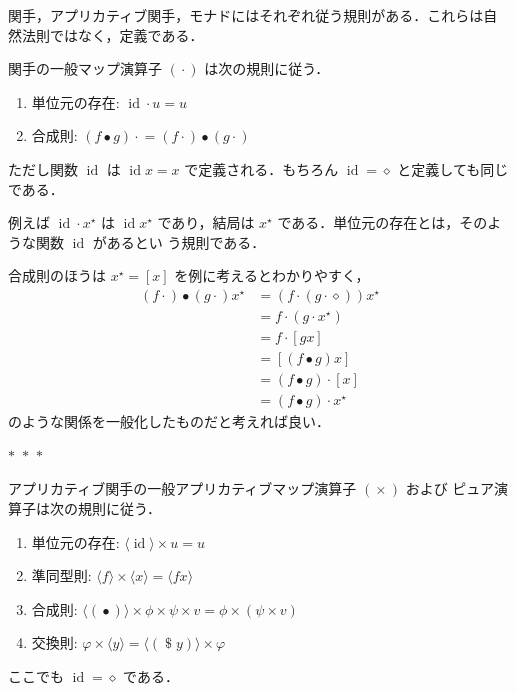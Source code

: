 \documentclass[a5paper,twoside,fleqn,draft]{jsbook}
\newcommand{\separator}{\begin{center}$*$~$*$~$*$\end{center}}
\newcommand{\mAnonParam}{\diamond}
\DeclareMathOperator{\mId}{id}
\DeclareMathOperator{\mApply}{\$}
\DeclareMathOperator{\mAppMap}{\times}
\DeclareMathOperator{\mComp}{\bullet} %
\DeclareMathOperator{\mMap}{\cdot} %
\newcommand{\mListWith}[1]{\left[#1\right]}
\newcommand{\mPureWith}[1]{\langle#1\rangle}
\newcommand{\mList}[1]{{#1}^\mathrm{\star}}
\begin{document}
関手，アプリカティブ関手，モナドにはそれぞれ従う規則がある．これらは自
然法則ではなく，定義である．

関手の一般マップ演算子 $(\mMap)$ は次の規則に従う．
\begin{enumerate}
\item 単位元の存在: $\mId\mMap u=u$
\item 合成則: $(f\mComp g)\mMap=(f\mMap)\mComp{}(g\mMap)$%
\end{enumerate}
ただし関数 $\mId$ は $\mId x=x$ で定義される．もちろん
$\mId=\mAnonParam$ と定義しても同じである．

例えば $\mId\mMap\mList{x}$ は $\mId\mList{x}$ であり，結局は
$\mList{x}$ である．単位元の存在とは，そのような関数 $\mId$ があるとい
う規則である．

合成則のほうは $\mList{x}=\mListWith{x}$ を例に考えるとわかりやすく，
\begin{align}
(f\mMap)\mComp(g\mMap)\mList{x}
&=(f\mMap{}(g\mMap\mAnonParam))\mList{x}\\
&=f\mMap{}(g\mMap\mList{x})\\
&=f\mMap{}\mListWith{gx}\\
&=\mListWith{(f\mComp g)x}\\
&=(f\mComp g)\mMap{}\mListWith{x}\\
&=(f\mComp g)\mMap\mList{x}
\end{align}
のような関係を一般化したものだと考えれば良い．

\separator

アプリカティブ関手の一般アプリカティブマップ演算子 $(\mAppMap)$ および
ピュア演算子は次の規則に従う．
\begin{enumerate}
\item 単位元の存在: $\mPureWith{\mId}\mAppMap u=u$
\item 準同型則: $\mPureWith{f}\mAppMap\mPureWith{x}=\mPureWith{fx}$
\item 合成則: $\mPureWith{(\mComp)}\mAppMap\phi\mAppMap\psi\mAppMap v=\phi\mAppMap{}(\psi\mAppMap v)$
\item 交換則: $\varphi\mAppMap\mPureWith{y}=\mPureWith{(\mApply y)}\mAppMap\varphi$
\end{enumerate}
ここでも $\mId=\mAnonParam$ である．
\end{document}
